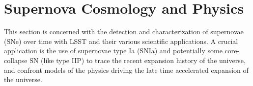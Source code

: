 

%
%
%
%
%
%
%
%
\clearpage
\newpage

\section{Supernova Cosmology and Physics}
\def\secname{supernovae}\label{sec:\secname}



This section is concerned with the detection and characterization of
supernovae (SNe) over time with LSST and their various scientific
applications. A crucial application is the use of supernovae type
Ia (SNIa) and potentially some core-collapse SN (like type IIP) to trace
the recent expansion history of the universe, and confront models of the
physics driving the late time accelerated expansion of the universe.

